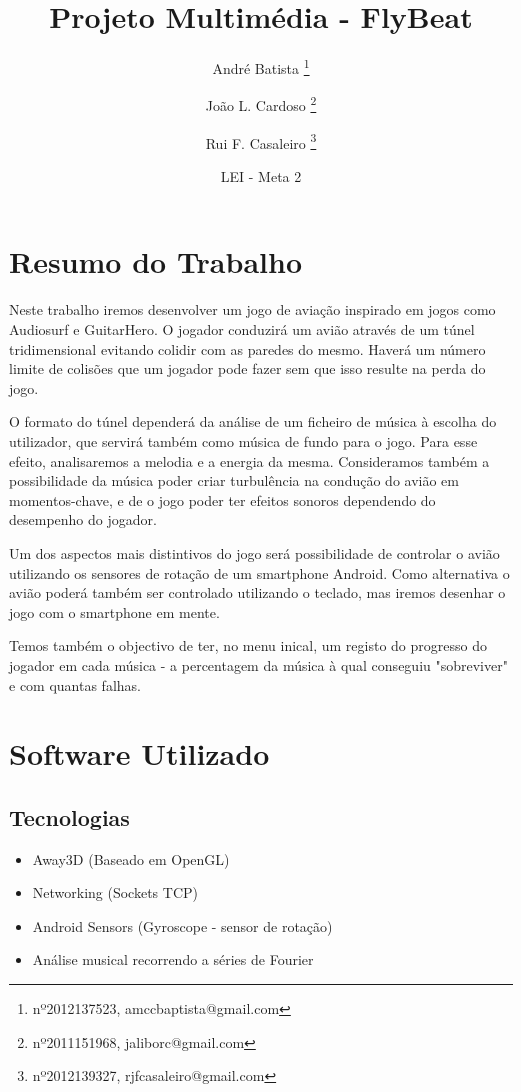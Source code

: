 \documentclass{article}
\title{Projeto Multimédia - FlyBeat}
\author{André Batista \thanks{nº2012137523, amccbaptista@gmail.com} \and João L. Cardoso \thanks{nº2011151968, jaliborc@gmail.com} \and Rui F. Casaleiro \thanks{nº2012139327, rjfcasaleiro@gmail.com}}
\date{LEI - Meta 2}
\begin{document}
\maketitle
\section{Resumo do Trabalho}
Neste trabalho iremos desenvolver um jogo de aviação inspirado em jogos como Audiosurf e GuitarHero. O jogador conduzirá um avião através de um túnel tridimensional evitando colidir com as paredes do mesmo. Haverá um número limite de colisões que um jogador pode fazer sem que isso resulte na perda do jogo.

O formato do túnel dependerá da análise de um ficheiro de música à escolha do utilizador, que servirá também como música de fundo para o jogo. Para esse efeito, analisaremos a melodia e a energia da mesma. Consideramos também a possibilidade da música poder criar turbulência na condução do avião em momentos-chave, e de o jogo poder ter efeitos sonoros dependendo do desempenho do jogador.

Um dos aspectos mais distintivos do jogo será possibilidade de controlar o avião utilizando os sensores de rotação de um smartphone Android. Como alternativa o avião poderá também ser controlado utilizando o teclado, mas iremos desenhar o jogo com o smartphone em mente.

Temos também o objectivo de ter, no menu inical, um registo do progresso do jogador em cada música - a percentagem da música à qual conseguiu "sobreviver" e com quantas falhas.

\section{Software Utilizado}
\subsection{Tecnologias}
\begin{itemize}
\item Away3D (Baseado em OpenGL)
\item Networking (Sockets TCP)
\item Android Sensors (Gyroscope - sensor de rotação)
\item Análise musical recorrendo a séries de Fourier
\end{itemize}
\end{document}
